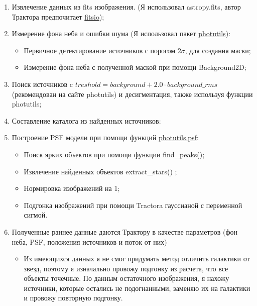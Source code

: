\documentclass[12pt,a4paper]{article}
\begin{document}
\begin{enumerate}

    \item Извлечение данных из fits изображения. (Я использовал astropy.fits, автор Трактора предпочитает \href{https://github.com/esheldon/fitsio}{fitsio});
    \item Измерение фона неба и ошибки шума (Я использовал пакет \href{https://photutils.readthedocs.io/en/stable/index.html}{photutils}):
        \begin{itemize}
            \item Первичное детектирование источников с порогом 2$\sigma$, для создания маски;
            \item Измерение фона неба с полученной маской при помощи Background2D;
        \end{itemize}
    \item Поиск источников c $treshold = background + 2.0 \cdot background\_rms$ (рекомендован на сайте photutils) и десигментация, также используя функции photutils;
    \item Составление каталога из найденных источников:    
    \item Построение PSF модели при помощи функций \href{https://photutils.readthedocs.io/en/stable/psf.html#module-photutils.psf}{photutils.psf}:
        \begin{itemize}
            \item Поиск ярких объектов при помощи функции find\_peaks();
            \item Извлечение найденных объектов extract\_stars() ;
            \item Нормировка изображений на 1;
            \item Подгонка изображений при помощи Tractora гауссианой с переменной сигмой.
        \end{itemize}
    \item Полученные раннее данные даются Трактору в качестве параметров (фон неба, PSF, положения источников и поток от них)
        \begin{itemize}
            \item Из имеющихся данных я не смог придумать метод отличить галактики от звезд, поэтому я изначально провожу подгонку из расчета, что все объекты точечные. По данным остаточного изображения, я нахожу источники, которые остались не подогнанными, заменяю их на галактики и провожу повторную подгонку. 
         \end{itemize}               

     \end{enumerate}
        
\end{document}
